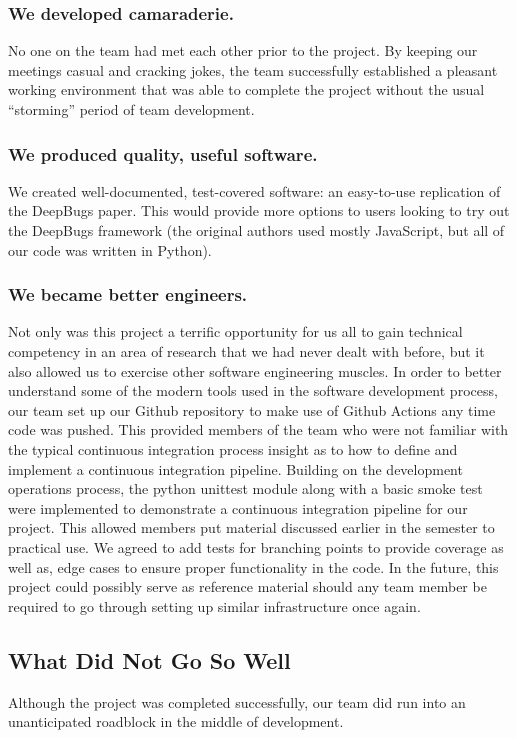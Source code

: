 \subsubsection{\textbf{We developed camaraderie.}} No one on the team had met each other prior to the project. By keeping our meetings casual and cracking jokes, the team successfully established a pleasant working environment that was able to complete the project without the usual ``storming'' period of team development.

\subsubsection{\textbf{We produced quality, useful software.}} We created well-documented, test-covered software: an easy-to-use replication of the DeepBugs paper. This would provide more options to users looking to try out the DeepBugs framework (the original authors used mostly JavaScript, but all of our code was written in Python).

\subsubsection{\textbf{We became better engineers.}} Not only was this project a terrific opportunity for us all to gain technical competency in an area of research that we had never dealt with before, but it also allowed us to exercise other software engineering muscles. In order to better understand some of the modern tools used in the software development process, our team set up our Github repository to make use of Github Actions any time code was pushed. This provided members of the team who were not familiar with the typical continuous integration process insight as to how to define and implement a continuous integration pipeline. Building on the development operations process, the python unittest module along with a basic smoke test were implemented to demonstrate a continuous integration pipeline for our project. This allowed members put material discussed earlier in the semester to practical use. We agreed to add tests for branching points to provide coverage as well as, edge cases to ensure proper functionality in the code. In the future, this project could possibly serve as reference material should any team member be required to go through setting up similar infrastructure once again.  


\subsection{What Did Not Go So Well}
Although the project was completed successfully, our team did run into an unanticipated roadblock in the middle of development.


